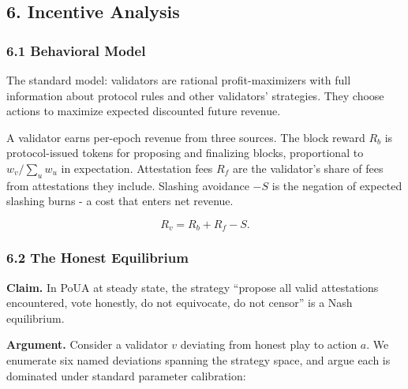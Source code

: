 \documentclass[
  11pt,
]{article}
\begin{document}
\subsection{6. Incentive Analysis}\label{incentive-analysis}

\subsubsection{6.1 Behavioral Model}\label{behavioral-model}

The standard model: validators are rational profit-maximizers with full
information about protocol rules and other validators' strategies. They
choose actions to maximize expected discounted future revenue.

A validator earns per-epoch revenue from three sources. The block reward
\(R_b\) is protocol-issued tokens for proposing and finalizing blocks,
proportional to \(w_v / \sum_u w_u\) in expectation. Attestation fees
\(R_f\) are the validator's share of fees from attestations they
include. Slashing avoidance \(-S\) is the negation of expected slashing
burns - a cost that enters net revenue.

\[R_v = R_b + R_f - S.\]

\subsubsection{6.2 The Honest Equilibrium}\label{the-honest-equilibrium}

\textbf{Claim.} In PoUA at steady state, the strategy ``propose all
valid attestations encountered, vote honestly, do not equivocate, do not
censor'' is a Nash equilibrium.

\textbf{Argument.} Consider a validator \(v\) deviating from honest play
to action \(a\). We enumerate six named deviations spanning the strategy
space, and argue each is dominated under standard parameter calibration:
\end{document}
